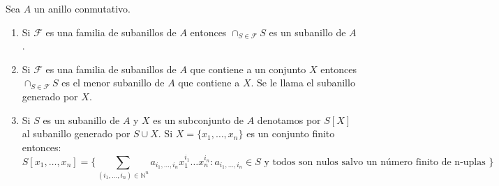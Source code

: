 \begin{proposition}
Sea $A$ un anillo conmutativo. 

\begin{enumerate}
\item Si $\mathcal{F}$ es una familia de subanillos de $A$ entonces $\cap_{S \in \mathcal{F}} S$ es un subanillo de $A$. 
\item Si $\mathcal{F}$ es una familia de subanillos de $A$ que contiene a un conjunto $X$ entonces $\cap_{S \in \mathcal{F}} S$ es el menor subanillo de $A$ que contiene a $X$. Se le llama el subanillo generado por $X$. 
\item Si $S$ es un subanillo de $A$ y $X$ es un subconjunto de $A$ denotamos por $S[X]$ al subanillo generado por $S \cup X$. Si $X = \{x_1,\ldots,x_n \}$ es un conjunto finito entonces: $$S[x_1,\ldots,x_n] = \{\sum_{(i_1,\ldots,i_n) \in \mathbb{N}^n} a_{i_1,\ldots,i_n} x_1^{i_1} \ldots x_n^{i_n}: a_{i_1,\ldots,i_n} \in S \text{ y todos son nulos salvo un número finito de n-uplas } \}$$
\end{enumerate}
\end{proposition}
